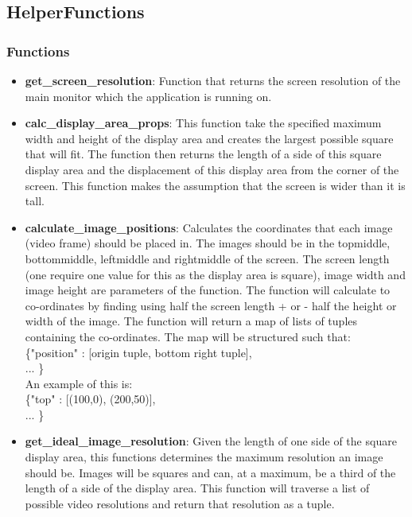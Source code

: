 \documentclass{article}
\begin{document}
\subsection{HelperFunctions}
\subsubsection{Functions}

\begin{itemize}
	\item \textbf{get\_screen\_resolution}: Function that returns the screen resolution of the main monitor which the application is running on.

	\item \textbf{calc\_display\_area\_props}: This function take the specified maximum width and height of the display area and creates the largest possible square that will fit. The function then returns the length of a side of this square display area and the displacement of this display area from the corner of the screen. This function makes the assumption that the screen is wider than it is tall.
	
	\item \textbf{calculate\_image\_positions}: Calculates the co\-ordinates that each image (video frame) should be placed in. The images should be in the top\-middle, bottom\-middle, left\-middle and right\-middle of the screen. The screen length (one require one value for this as the display area is square), image width and image height are parameters of the function. The function will calculate to co-ordinates by finding using half the screen length + or - half the height or width of the image. The function will return a map of lists of tuples containing the co-ordinates. The map will be structured such that: \\
	\{"position" : [origin tuple, bottom right tuple],\\... \} \\
	An example of this is: \\
	\{"top" : [(100,0), (200,50)],\\... \}	
	
	\item \textbf{get\_ideal\_image\_resolution}: Given the length of one side of the square display area, this functions determines the maximum resolution an image should be. Images will be squares and can, at a maximum, be a third of the length of a side of the display area. This function will traverse a list of possible video resolutions and return that resolution as a tuple.
	

\end{itemize}
\end{document}
